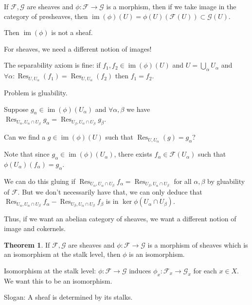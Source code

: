 \documentclass{article}
\theoremstyle{definition}
\newtheorem{theorem}{Theorem}
\begin{document}
    If \(\mathcal{F}, \mathcal{G}\) are sheaves and \(\phi: \mathcal{F} \to \mathcal{G}\) is a morphism, then if we take image in the category of presheaves, then \(\operatorname{im} (\phi) (U) = \phi(U)(\mathcal{F}(U)) \subset \mathcal{G}(U)\).

    Then \(\operatorname{im} (\phi)\) is not a sheaf.

    For sheaves, we need a different notion of images!

    The separability axiom is fine: if \(f_1, f_2\in \operatorname{im} (\phi)(U)\) and \(U = \bigcup_\alpha U_\alpha\) and \(\forall \alpha : \operatorname{Res}_{U, U_\alpha}(f_1) = \operatorname{Res}_{U,U_\alpha}(f_2)\) then \(f_1 = f_2\).

    Problem is gluability.

    Suppose \(g_\alpha \in \operatorname{im} (\phi) (U_\alpha)\) and \(\forall \alpha ,\beta\) we have \(\operatorname{Res}_{U_\alpha, U_\alpha \cap U_\beta} g_\alpha  = \operatorname{Res}_{U_\beta, U_\alpha \cap U_\beta} g_\beta\).

    Can we find a \(g\in \operatorname{im} (\phi)(U)\) such that \(\operatorname{Res}_{U,U_\alpha} (g) = g_\alpha\)?

    Note that since \(g_\alpha \in \operatorname{im} (\phi)(U_\alpha)\), there exists \(f_\alpha\in \mathcal{F}(U_\alpha)\) such that \(\phi(U_\alpha) (f_\alpha) = g_\alpha\).

    We can do this gluing if \(\operatorname{Res}_{U_\alpha , U_\alpha \cap U_\beta} f_\alpha = \operatorname{Res}_{U_\beta , U_\alpha \cap U_\beta}\) for all \(\alpha , \beta\) by gluability of \(\mathcal{F}\). But we don't necessarily have that, we can only deduce that \(\operatorname{Res}_{U_\alpha , U_\alpha \cap U_\beta} f_\alpha - \operatorname{Res}_{U_\beta , U_\alpha \cap U_\beta} f_\beta\)  is in \(\ker \phi(U_\alpha \cap U_\beta)\).

    Thus, if we want an abelian category of sheaves, we want a different notion of image and cokernels.

    \begin{theorem}
        If \(\mathcal{F}, \mathcal{G}\) are sheaves and \(\phi : \mathcal{F} \to \mathcal{G}\) is a morphism of sheaves which is an isomorphism at the stalk level, then \(\phi\) is an isomorphism.

        Isomorphism at the stalk level: \(\phi: \mathcal{F} \to \mathcal{G}\) induces \(\phi_x: \mathcal{F}_x \to \mathcal{G}_x\) for each \(x\in X\). We want this to be an isomorphism.

        Slogan: A sheaf is determined by its stalks.
    \end{theorem}
\end{document}
